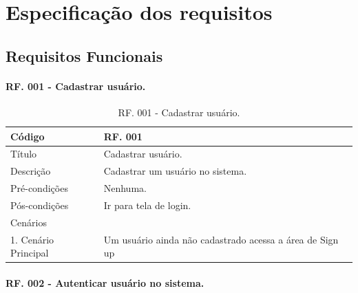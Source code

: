 \documentclass[11pt]{article}
\begin{document}
  \newpage

  \section{Especificação dos requisitos}

    \subsection{Requisitos Funcionais}
    
      \paragraph{RF. 001 - Cadastrar usuário.} \hspace{10pt}
      
      \begin{table}[h]
        \begin{center}
            \begin{tabular}{ | p{5cm} | p{10cm} | }
              \hline
              Código\cellcolor{gray} & RF. 001\cellcolor{gray} \\
              \hline
              Título & Cadastrar usuário. \\
              \hline
              Descrição & Cadastrar um usuário no sistema. \\
              \hline
              Pré-condições & Nenhuma. \\
              \hline
              Pós-condições & Ir para tela de login. \\
              \hline
              Cenários &   \\
              \hline
              1.  Cenário Principal & Um usuário ainda não cadastrado acessa a área de Sign up \\
              \hline
            \end{tabular}
          \caption{RF. 001 - Cadastrar usuário.}
        \end{center}
      \end{table}

      \paragraph{RF. 002 - Autenticar usuário no sistema.} \hspace{10pt}
\end{document}
